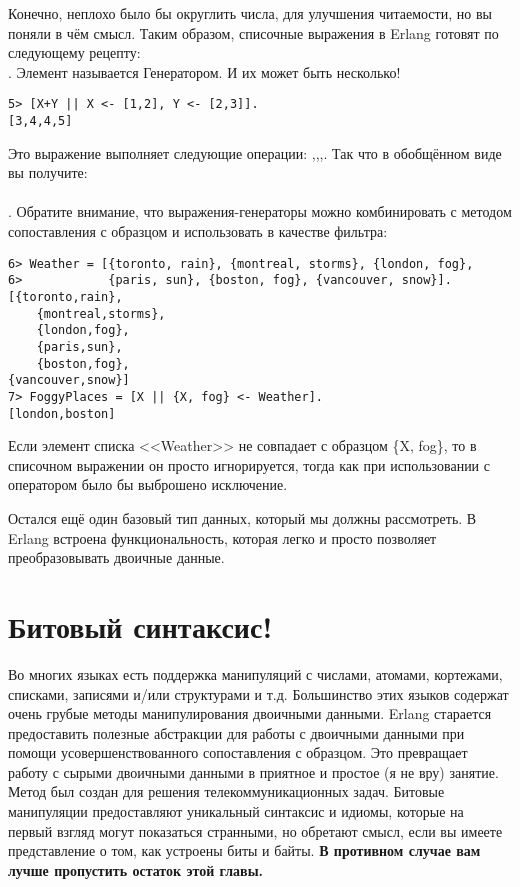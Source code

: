 Конечно, неплохо было бы округлить числа, для улучшения читаемости, но вы поняли в чём смысл. Таким образом, списочные выражения в Erlang готовят по следующему рецепту: \ops{NewList = [Expression || Pattern}\\ 
\ops{ $<-$ List, Condition1, Condition2, ... ConditionN]}. Элемент  называется Генератором. И их может быть несколько!\\ 
\begin{lstlisting}[style=repl]
5> [X+Y || X <- [1,2], Y <- [2,3]].
[3,4,4,5]
\end{lstlisting}

Это выражение выполняет следующие операции: ,,,. Так что в обобщённом виде вы получите: \\ 
\ops{[Expression || GeneratorExp1, GeneratorExp2, ..., GeneratorExpN,}\\ 
\ops{Condition1, Condition2, ... ConditionM]}. Обратите внимание, что выражения\--генераторы можно комбинировать с методом сопоставления с образцом и использовать в качестве фильтра:
\begin{lstlisting}[style=repl]
6> Weather = [{toronto, rain}, {montreal, storms}, {london, fog},  
6>            {paris, sun}, {boston, fog}, {vancouver, snow}].
[{toronto,rain},
    {montreal,storms},
    {london,fog},
    {paris,sun},
    {boston,fog},
{vancouver,snow}]
7> FoggyPlaces = [X || {X, fog} <- Weather].
[london,boston]
\end{lstlisting}

Если элемент списка <<Weather>> не совпадает с образцом \{X, fog\}, то в списочном выражении он просто игнорируется, тогда как при использовании с оператором \ops{=} было бы выброшено исключение.

Остался ещё один базовый тип данных, который мы должны рассмотреть. В Erlang встроена функциональность, которая легко и просто позволяет преобразовывать двоичные данные.
\section{Битовый синтаксис!}
Во многих языках есть поддержка манипуляций с числами, атомами, кортежами, списками, записями и/или структурами и т.д. Большинство этих языков содержат очень грубые методы манипулирования двоичными данными. Erlang старается предоставить полезные абстракции для работы с двоичными данными при помощи усовершенствованного сопоставления с образцом. Это превращает работу с сырыми двоичными данными в приятное и простое (я не вру) занятие. Метод был создан для решения телекоммуникационных задач. Битовые манипуляции предоставляют уникальный синтаксис и идиомы, которые на первый взгляд могут показаться странными, но обретают смысл, если вы имеете представление о том, как устроены биты и байты. \textbf{В противном случае вам лучше пропустить остаток этой главы.}

